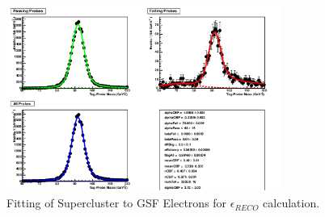 \begin{figure}[htb]
\centering
\includegraphics[width=0.8\textwidth]{Systematics/2012data_outputSCToGsfElectron.png}
\caption{Fitting of Supercluster to GSF Electrons for $\epsilon_{RECO}$ calculation.}
\label{fig:2012data_outputSCToGsfElectron}
\end{figure}






